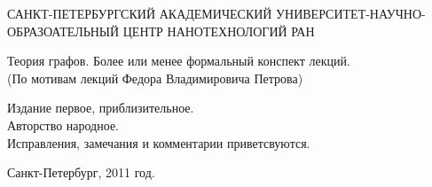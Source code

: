 \begin{titlepage}
\newpage

\begin{center}
САНКТ-ПЕТЕРБУРГСКИЙ АКАДЕМИЧЕСКИЙ УНИВЕРСИТЕТ-НАУЧНО-ОБРАЗОАТЕЛЬНЫЙ ЦЕНТР НАНОТЕХНОЛОГИЙ РАН
\end{center}
\hrulefill


\vspace{8em}

\begin{center}
\Large Теория графов. Более или менее формальный конспект лекций. \\ (По мотивам лекций Федора Владимировича Петрова)
\end{center}

\vspace{2.5em}

\begin{flushleft}
Издание первое, приблизительное. \\
Авторство народное. \\
Исправления, замечания и комментарии приветсвуются.
\end{flushleft}

\vspace{\fill}

\begin{center}
Санкт-Петербург, 2011 год.
\end{center}

\end{titlepage}
